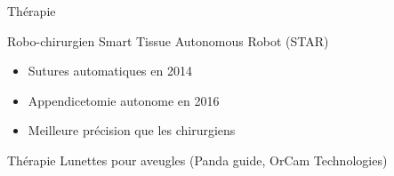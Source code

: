 \begin{frame}{Thérapie}
  \begin{minipage}{0.49\linewidth}
    Robo-chirurgien Smart Tissue Autonomous Robot (STAR)
    \begin{itemize}
      \item Sutures automatiques en 2014
      \item Appendicetomie autonome en 2016
      \item Meilleure précision que les chirurgiens
      \end{itemize}
  \end{minipage}
  \begin{minipage}{0.49\linewidth}
  \end{minipage}
\end{frame}

\begin{frame}{Thérapie}
  Lunettes pour aveugles (Panda guide, OrCam Technologies)
\end{frame}

